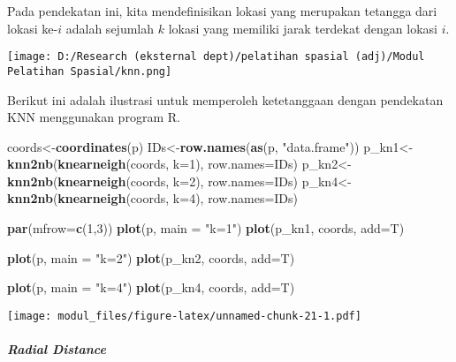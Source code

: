 \documentclass[
]{book}
\newenvironment{Shaded}{\begin{snugshade}}{\end{snugshade}}
\newcommand{\DataTypeTok}[1]{\textcolor[rgb]{0.13,0.29,0.53}{#1}}
\newcommand{\DecValTok}[1]{\textcolor[rgb]{0.00,0.00,0.81}{#1}}
\newcommand{\KeywordTok}[1]{\textcolor[rgb]{0.13,0.29,0.53}{\textbf{#1}}}
\newcommand{\NormalTok}[1]{#1}
\newcommand{\StringTok}[1]{\textcolor[rgb]{0.31,0.60,0.02}{#1}}
\begin{document}
Pada pendekatan ini, kita mendefinisikan lokasi yang merupakan tetangga dari lokasi ke-\(i\) adalah sejumlah \(k\) lokasi yang memiliki jarak terdekat dengan lokasi \(i\).

\texttt{[image: D:/Research (eksternal dept)/pelatihan spasial (adj)/Modul Pelatihan Spasial/knn.png]}

Berikut ini adalah ilustrasi untuk memperoleh ketetanggaan dengan pendekatan KNN menggunakan program R.

\begin{Shaded}
\begin{Highlighting}[]
\NormalTok{coords\textless{}{-}}\KeywordTok{coordinates}\NormalTok{(p)}
\NormalTok{IDs\textless{}{-}}\KeywordTok{row.names}\NormalTok{(}\KeywordTok{as}\NormalTok{(p, }\StringTok{"data.frame"}\NormalTok{))}
\NormalTok{p\_kn1\textless{}{-}}\KeywordTok{knn2nb}\NormalTok{(}\KeywordTok{knearneigh}\NormalTok{(coords, }\DataTypeTok{k=}\DecValTok{1}\NormalTok{), }\DataTypeTok{row.names=}\NormalTok{IDs)}
\NormalTok{p\_kn2\textless{}{-}}\KeywordTok{knn2nb}\NormalTok{(}\KeywordTok{knearneigh}\NormalTok{(coords, }\DataTypeTok{k=}\DecValTok{2}\NormalTok{), }\DataTypeTok{row.names=}\NormalTok{IDs)}
\NormalTok{p\_kn4\textless{}{-}}\KeywordTok{knn2nb}\NormalTok{(}\KeywordTok{knearneigh}\NormalTok{(coords, }\DataTypeTok{k=}\DecValTok{4}\NormalTok{), }\DataTypeTok{row.names=}\NormalTok{IDs)}

\KeywordTok{par}\NormalTok{(}\DataTypeTok{mfrow=}\KeywordTok{c}\NormalTok{(}\DecValTok{1}\NormalTok{,}\DecValTok{3}\NormalTok{))}
\KeywordTok{plot}\NormalTok{(p, }\DataTypeTok{main =} \StringTok{"k=1"}\NormalTok{)}
\KeywordTok{plot}\NormalTok{(p\_kn1, coords, }\DataTypeTok{add=}\NormalTok{T)}

\KeywordTok{plot}\NormalTok{(p, }\DataTypeTok{main =} \StringTok{"k=2"}\NormalTok{)}
\KeywordTok{plot}\NormalTok{(p\_kn2, coords, }\DataTypeTok{add=}\NormalTok{T)}

\KeywordTok{plot}\NormalTok{(p, }\DataTypeTok{main =} \StringTok{"k=4"}\NormalTok{)}
\KeywordTok{plot}\NormalTok{(p\_kn4, coords, }\DataTypeTok{add=}\NormalTok{T)}
\end{Highlighting}
\end{Shaded}

\texttt{[image: modul\_files/figure-latex/unnamed-chunk-21-1.pdf]}

\hypertarget{radial-distance}{%
\paragraph{\texorpdfstring{\emph{Radial Distance}}{Radial Distance}}\label{radial-distance}}
\end{document}
